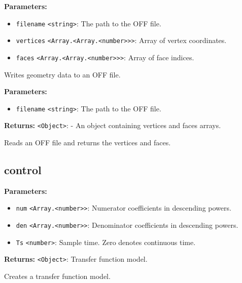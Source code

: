 \documentclass[12pt,a4paper]{article}
\begin{document}
\noindent \textbf{Parameters:}
\begin{itemize}
  \item \texttt{filename} \texttt{<string>}: The path to the OFF file.
  \item \texttt{vertices} \texttt{<Array.<Array.<number>>>}: Array of vertex coordinates.
  \item \texttt{faces} \texttt{<Array.<Array.<number>>>}: Array of face indices.
\end{itemize}

\noindent Writes geometry data to an OFF file.

\vspace{5mm}
\noindent {}


\noindent \textbf{Parameters:}
\begin{itemize}
  \item \texttt{filename} \texttt{<string>}: The path to the OFF file.
\end{itemize}

\noindent \textbf{Returns:} \texttt{<Object>}: - An object containing vertices and faces arrays.

\noindent Reads an OFF file and returns the vertices and faces.


\subsection{control}
\vspace{5mm}
\noindent {}


\noindent \textbf{Parameters:}
\begin{itemize}
  \item \texttt{num} \texttt{<Array.<number>>}: Numerator coefficients in descending powers.
  \item \texttt{den} \texttt{<Array.<number>>}: Denominator coefficients in descending powers.
  \item \texttt{Ts} \texttt{<number>}: Sample time. Zero denotes continuous time.
\end{itemize}

\noindent \textbf{Returns:} \texttt{<Object>}: Transfer function model.

\noindent Creates a transfer function model.
\end{document}
